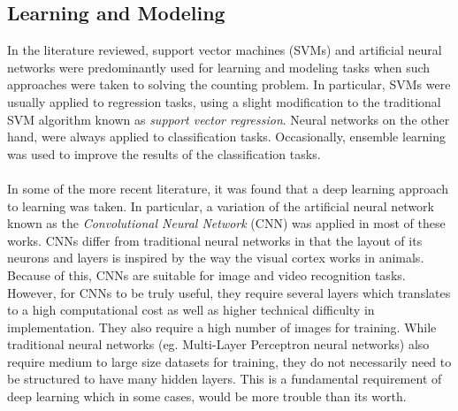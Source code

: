 \subsection{Learning and Modeling}
In the literature reviewed, support vector machines (SVMs) and artificial neural networks were predominantly used for learning and modeling tasks when such approaches were taken to solving the counting problem. In particular, SVMs were usually applied to regression tasks, using a slight modification to the traditional SVM algorithm known as \textit{support vector regression}. Neural networks on the other hand, were always applied to classification tasks. Occasionally, ensemble learning was used to improve the results of the classification tasks.\\ \\
%
In some of the more recent literature, it was found that a deep learning approach to learning was taken. In particular, a variation of the artificial neural network known as the \textit{Convolutional Neural Network} (CNN) was applied in most of these works. CNNs differ from traditional neural networks in that the layout of its neurons and layers is inspired by the way the visual cortex works in animals. Because of this, CNNs are suitable for image and video recognition tasks. However, for CNNs to be truly useful, they require several layers which translates to a high computational cost as well as higher technical difficulty in implementation. They also require a high number of images for training. While traditional neural networks (eg. Multi-Layer Perceptron neural networks) also require medium to large size datasets for training, they do not necessarily need to be structured to have many hidden layers. This is a fundamental requirement of deep learning which in some cases, would be more trouble than its worth.

